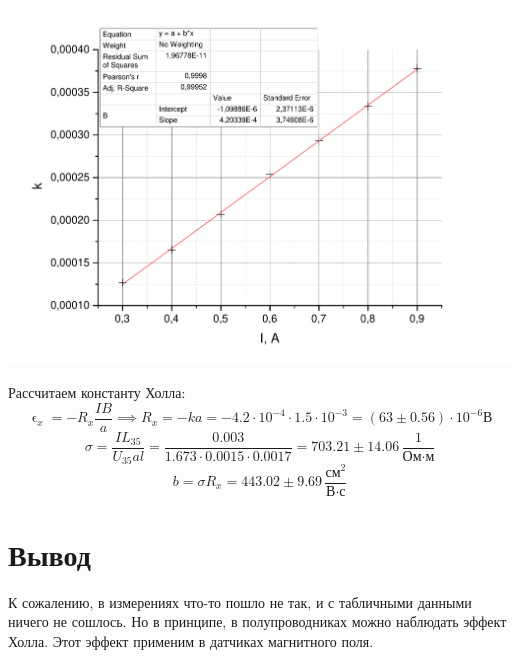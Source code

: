 \documentclass[a4paper,12pt]{article}
\begin{document}
		\includegraphics[width = 0.78\linewidth]{KFI}
		
		Рассчитаем константу Холла:
		\begin{equation}
			\upvarepsilon_x = -R_x\frac{IB}{a} \implies R_x = -ka = -4.2\cdot 10^{-4}\cdot 1.5\cdot 10^{-3} = \left(63 \pm 0.56\right)\cdot 10^{-6} \text{В}
		\end{equation}
		\begin{equation}
			\sigma = \frac{IL_{35}}{U_{35}al} = \frac{0.003}{1.673\cdot 0.0015\cdot 0.0017} = 703.21 \pm 14.06\, \frac{1}{\text{Ом}\cdot\text{м}}
		\end{equation}
		\begin{equation}
			b = \sigma R_x = 443.02\pm 9.69 \, \frac{\text{см}^2}{\text{В}\cdot\text{с}}
		\end{equation}
	\section{Вывод}
		К сожалению, в измерениях что-то пошло не так, и с табличными данными ничего не сошлось. Но в принципе, в полупроводниках можно наблюдать эффект Холла. Этот эффект применим в датчиках магнитного поля.
		
\end{document}
